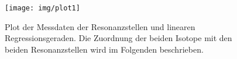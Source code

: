 



\begin{figure}
\centering
\caption{Plot der Messdaten der Resonanzstellen und linearen Regressionsgeraden. Die Zuordnung der beiden Isotope mit den beiden Resonanzstellen wird im Folgenden beschrieben.}
\texttt{[image: img/plot1]}
\label{fig:plot1}
\end{figure}
